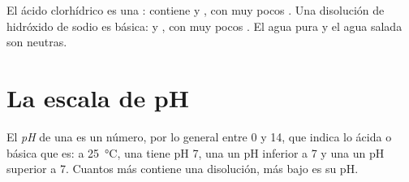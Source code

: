 \begin{example}\label{ex:g9:acids-bases-ph:three}
El ácido clorhídrico es una : contiene 
 y , con muy pocos . Una disolución de
hidróxido de sodio es básica:  y , con muy pocos
. El agua pura y el agua salada son neutras.
\end{example}

\section{La escala de pH}

\begin{definition}[pH]\label{def:g9:acids-bases-ph:ph}
El \emph{pH} de una  es un número, por lo
general entre 0 y 14, que indica lo ácida o básica que es: a
\qty{25}{\celsius}, una  tiene pH 7, una  un pH inferior a 7 y una  un pH superior a 7.
Cuantos más   contiene una disolución, más bajo es su pH.
\end{definition}

